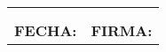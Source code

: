 \documentclass[10pt,a4paper]{article}
\begin{document}
\begin{center}
{\begin{tabular}{|p{2.8cm}p{2.8cm}p{2.8cm}p{2.8cm}|}
\hline 
\multicolumn{1}{l}{\scriptsize{}}&&& \multicolumn{1}{l}{ \scriptsize{}}\\
\multicolumn{1}{l}{\scriptsize{}}&&& \multicolumn{1}{l}{ \scriptsize{}}\\
\multicolumn{2}{l}{\begin{minipage}[t]{5.5 cm}\scriptsize{\textbf{FECHA: }}\end{minipage}}&\multicolumn{2}{l}{\begin{minipage}[t]{5.5 cm}\scriptsize{\textbf{FIRMA: }}\end{minipage}}\\
\end{tabular}}

\end{center}
\vspace{0.6cm}
\hspace{13cm}
\end{document}
